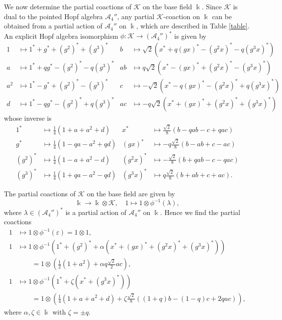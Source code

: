 \documentclass[reqno]{amsart}
\theoremstyle{definition}
\numberwithin{equation}{section}\theoremstyle{plain}
\theoremstyle{definition}
\def \K {\mathcal{K}}
\def \A {\mathcal{A}}
\begin{document}
We now determine the partial coactions of \(\K\) on the base field \(\Bbbk\). Since \(\K\) is dual to the pointed Hopf algebra \(\A_4''\), any partial \(\K\)-coaction on \(\Bbbk\) can be obtained from a partial action of \(\A_4''\) on \(\Bbbk\), which are described in Table \ref{table}. An explicit Hopf algebra isomorphism \(\phi : \K \to (\A_4'')^*\) is given by
\begin{align*}
    1 &\mapsto 1^* + g^* + (g^2)^* + (g^3)^* & b &\mapsto \sqrt{2} \left(x^* + q(gx)^* - (g^2x)^* - q(g^3x)^*\right) \\
    a &\mapsto 1^* + qg^* - (g^2)^* - q(g^3)^* & ab &\mapsto q \sqrt{2} \left( x^* -  (gx)^* +  (g^2x)^* -  (g^3x)^*\right) \\
    a^2 & \mapsto 1^* -g^* + (g^2)^* - (g^3)^* & c & \mapsto -\sqrt{2} \left(x^* - q (gx)^* - (g^2 x)^* + q (g^3 x)^*\right) \\
    d & \mapsto 1^* - qg^* - (g^2)^* + q(g^3)^* & ac &\mapsto -q \sqrt{2} \left( x^* + (gx)^* + (g^2x)^* + (g^3x)^* \right)
\end{align*}
whose inverse is
\begin{align*}
    1^* &\mapsto \frac{1}{4} (1 + a + a^2 + d)& x^* &\mapsto \frac{\sqrt{2}}{8} (b - qab - c + q ac) \\
    g^* &\mapsto \frac{1}{4} (1 - qa - a^2 + qd) & (gx)^* &\mapsto -q \frac{\sqrt{2}}{8} ( b - ab + c - ac) \\
    (g^2)^* &\mapsto \frac{1}{4} (1 - a + a^2 - d) & (g^2 x)^* &\mapsto - \frac{\sqrt{2}}{8} (b + q ab - c -q ac) \\
    (g^3)^* &\mapsto \frac{1}{4} (1 + qa - a^2 -qd) & (g^3 x)^* &\mapsto q \frac{\sqrt{2}}{8} (b + ab + c + ac).    
\end{align*}

The partial coactions of \(\mathcal{K}\) on the base field are given by
\[\Bbbk \to \Bbbk \otimes \mathcal{K}, \quad 1 \mapsto 1 \otimes \phi^{-1}(\lambda),\]
where \(\lambda \in (\mathcal{A}_{4}'')^*\) is a partial action of \(\mathcal{A}_4''\) on \(\Bbbk\). Hence we find the partial coactions
\begin{align*}
    1 &\mapsto 1 \otimes \phi^{-1}(\varepsilon) = 1 \otimes 1, \\
    1 &\mapsto 1 \otimes \phi^{-1}\left(1^* + (g^2)^* + \alpha( x^* + (gx)^* + (g^2x)^* + (g^3x)^*)\right) \\
    &\qquad = 1 \otimes \left(\frac{1}{2}(1 + a^2) + \alpha q \frac{\sqrt{2}}{2} ac \right), \\
     1 &\mapsto 1 \otimes \phi^{-1}\left(1^* + \zeta ( x^* + (g^3x)^*)\right) \\
    &\qquad = 1 \otimes \left(\frac{1}{4}(1 + a + a^2 + d) +\zeta \frac{\sqrt{2}}{8} ((1 + q)b - (1 - q) c + 2q ac)\right),
\end{align*}
where \(\alpha, \zeta \in \Bbbk\) with \(\zeta = \pm q\).
\end{document}
